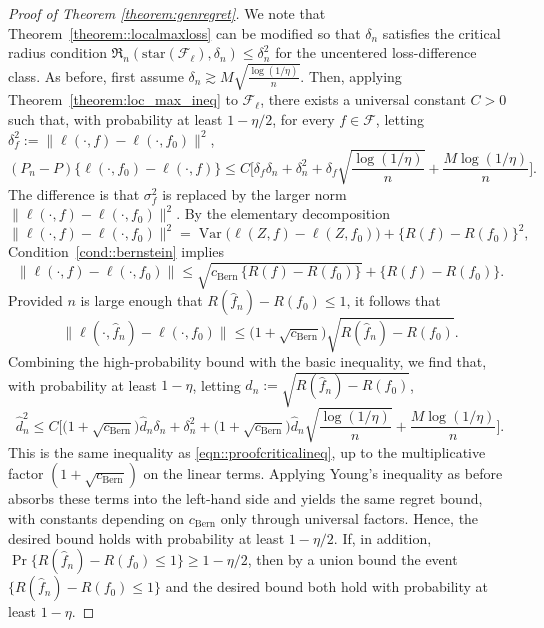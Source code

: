 \documentclass[10pt,a4paper]{amsart}
\newcommand{\Var}{\operatorname{Var}}
\begin{document}
\begin{proof}[Proof of Theorem \ref{theorem:genregret}]
We note that Theorem~\ref{theorem::localmaxloss} can be modified so that \(\delta_n\) satisfies the
critical radius condition \(\mathfrak{R}_n(\mathrm{star}(\mathcal{F}_{\ell}),\delta_n)\le \delta_n^2\)
for the uncentered loss-difference class. As before, first assume
\(\delta_n \gtrsim M\sqrt{\frac{\log(1/\eta)}{n}}\). Then, applying
Theorem~\ref{theorem:loc_max_ineq} to \(\mathcal{F}_{\ell}\), there exists a universal constant
\(C>0\) such that, with probability at least \(1-\eta/2\), for every \(f\in\mathcal{F}\), letting
\(\delta_f^2 := \|\ell(\cdot,f)-\ell(\cdot,f_0)\|^2\),
\[
(P_n-P)\{\ell(\cdot,f_0)-\ell(\cdot,f)\}
\le
C\Biggl[
\delta_f \delta_n
+
\delta_n^2
+
\delta_f \sqrt{\frac{\log(1/\eta)}{n}}
+
\frac{M\log(1/\eta)}{n}
\Biggr].
\]
The difference is that \(\sigma_f^2\) is replaced by the larger norm
\(\|\ell(\cdot,f)-\ell(\cdot,f_0)\|^2\). By the elementary decomposition
\[
\|\ell(\cdot,f)-\ell(\cdot,f_0)\|^2
=
\Var\bigl(\ell(Z,f)-\ell(Z,f_0)\bigr)
+\{R(f)-R(f_0)\}^2,
\]
Condition~\ref{cond::bernstein} implies
\[
\|\ell(\cdot,f)-\ell(\cdot,f_0)\|
\le
\sqrt{c_{\mathrm{Bern}}\,\{R(f)-R(f_0)\}}
+
\{R(f)-R(f_0)\}.
\]
Provided \(n\) is large enough that \(R(\hat f_n)-R(f_0)\le 1\), it follows that
\[
\|\ell(\cdot,\hat f_n)-\ell(\cdot,f_0)\|
\le
\bigl(1+\sqrt{c_{\mathrm{Bern}}}\bigr)\sqrt{R(\hat f_n)-R(f_0)}.
\]
Combining the high-probability bound with the basic inequality, we find that, with probability at
least \(1-\eta\), letting \(\hat d_n := \sqrt{R(\hat f_n)-R(f_0)}\),
\[
\hat d_n^2
\le
C\Biggl[
\bigl(1+\sqrt{c_{\mathrm{Bern}}}\bigr)\hat d_n \delta_n
+
\delta_n^2
+
\bigl(1+\sqrt{c_{\mathrm{Bern}}}\bigr)\hat d_n\sqrt{\frac{\log(1/\eta)}{n}}
+
\frac{M\log(1/\eta)}{n}
\Biggr].
\]
This is the same inequality as \eqref{eqn::proofcriticalineq}, up to the multiplicative factor
\((1+\sqrt{c_{\mathrm{Bern}}})\) on the linear terms. Applying Young's inequality as before absorbs
these terms into the left-hand side and yields the same regret bound, with constants depending on
\(c_{\mathrm{Bern}}\) only through universal factors. Hence, the desired bound holds with probability
at least \(1-\eta/2\). If, in addition, \(\Pr\{R(\hat f_n)-R(f_0)\le 1\}\ge 1-\eta/2\), then by a union
bound the event \(\{R(\hat f_n)-R(f_0)\le 1\}\) and the desired bound both hold with probability at
least \(1-\eta\).




\end{proof}
\end{document}
